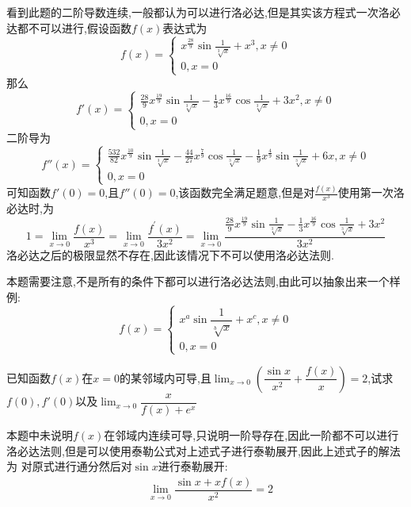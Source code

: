 \documentclass[8pt a4paper, oneside, UTF8]{ctexbook}
\begin{document}
\begin{sloppypar}
\begin{solution}
        看到此题的二阶导数连续,一般都认为可以进行洛必达,但是其实该方程式一次洛必达都不可以进行,假设函数$f(x)$表达式为$$f\left(x\right)=\begin{cases}x^{\frac{28}{9}}\sin\frac{1}{\sqrt[3]{x}}+x^3,x\neq0\\0,x=0\end{cases}$$那么$$f'\left(x\right)=\begin{cases}\frac{28}{9}x^{\frac{19}{9}}\sin\frac{1}{\sqrt[3]{x}}-\frac{1}{3}x^{\frac{16}{9}}\cos\frac{1}{\sqrt[3]{x}}+{3x^{2}},x\neq0\\0,x=0\end{cases}$$二阶导为$$f''(x)=\begin{cases}\frac{532}{82}x^{\frac{10}{9}}\sin\frac{1}{\sqrt[3]{x}}-\frac{44}{27}x^{\frac{7}{9}}\cos\frac{1}{\sqrt[3]{x}}-\frac{1}{9}x^{\frac{4}{9}}\sin\frac{1}{\sqrt[3]{x}}+6x,x\neq0\\0,x=0\end{cases}$$可知函数$f'(0)=0$,且$f''(0)=0$,该函数完全满足题意,但是对$\frac{f(x)}{x^3}$使用第一次洛必达时,为$$1=\lim_{x\to0}\frac{f\left(x\right)}{x^{3}}=\lim_{x\to0}\frac{f^{\prime}\left(x\right)}{3x^{2}}=\lim_{x\to0}\frac{\frac{28}9x^{\frac{19}9}\sin\frac1{\sqrt[3]{x}}-\frac13x^{\frac{16}9}\cos\frac1{\sqrt[3]{x}}+3x^2}{3x^{2}}$$洛必达之后的极限显然不存在,因此该情况下不可以使用洛必达法则.
    \end{solution}
    \begin{note}
        本题需要注意,不是所有的条件下都可以进行洛必达法则,由此可以抽象出来一个样例:
        $$f\left(x\right)=\begin{cases}x^a\sin\dfrac{1}{\sqrt[b]{x}}+x^c,x\neq0\\0,x=0\end{cases}$$
    \end{note}
    \begin{problem}
    已知函数$f(x)$在$x=0$的某邻域内可导,且$\lim_{x \to 0}(\dfrac{\sin x}{x^2}+\dfrac{f(x)}{x})=2$,试求$f(0),f'(0)$以及$\lim_{x\to0}\dfrac{x}{f(x)+e^x}$
    \end{problem}
    \begin{solution}
        本题中未说明$f(x)$在邻域内连续可导,只说明一阶导存在,因此一阶都不可以进行洛必达法则,但是可以使用泰勒公式对上述式子进行泰勒展开,因此上述式子的解法为
        对原式进行通分然后对$\sin x$进行泰勒展开:
        \begin{equation*}
            \begin{split}
                & \lim_{x \to 0}\dfrac{\sin x+xf(x)}{x^2}=2\\

\end{split}
\end{equation*}
\end{solution}
\end{sloppypar}
\end{document}
